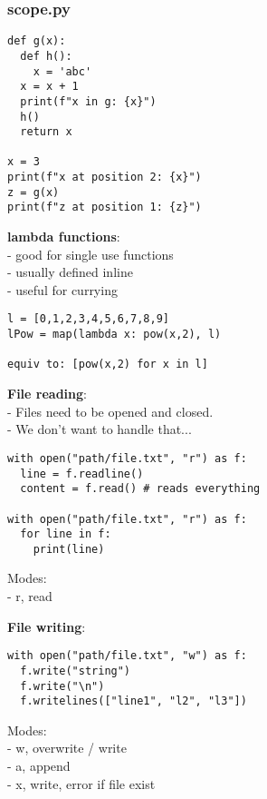 \documentclass{beamer}
\begin{document}
\begin{frame}[fragile]
    \frametitle{scope.py}
    \begin{example}
        \begin{verbatim}
def g(x):
  def h():
    x = 'abc'
  x = x + 1
  print(f"x in g: {x}")
  h()
  return x

x = 3
print(f"x at position 2: {x}")
z = g(x)
print(f"z at position 1: {z}")
        \end{verbatim}
    \end{example}
\end{frame}

\begin{frame}[fragile]
    \textbf{lambda functions}:\\
    - good for single use functions\\
    - usually defined inline\\
    - useful for currying
\begin{example}{}
\begin{verbatim}
l = [0,1,2,3,4,5,6,7,8,9]
lPow = map(lambda x: pow(x,2), l)

equiv to: [pow(x,2) for x in l]

\end{verbatim}
\end{example}
\end{frame}

\begin{frame}[fragile]
    \textbf{File reading}:\\
    - Files need to be opened and closed.\\
    - We don't want to handle that...\\
    \begin{example}
        \begin{verbatim}
with open("path/file.txt", "r") as f:
  line = f.readline()
  content = f.read() # reads everything

with open("path/file.txt", "r") as f:
  for line in f:
    print(line)
        \end{verbatim}
        Modes:\\
        - r, read\\
    \end{example}
\end{frame}
\begin{frame}[fragile]
    \textbf{File writing}:\\
    \begin{example}
        \begin{verbatim}
with open("path/file.txt", "w") as f:
  f.write("string")
  f.write("\n")
  f.writelines(["line1", "l2", "l3"])
    \end{verbatim}
        Modes:\\
        - w, overwrite / write\\
        - a, append\\
        - x, write, error if file exist
    \end{example}
\end{frame}
\end{document}
